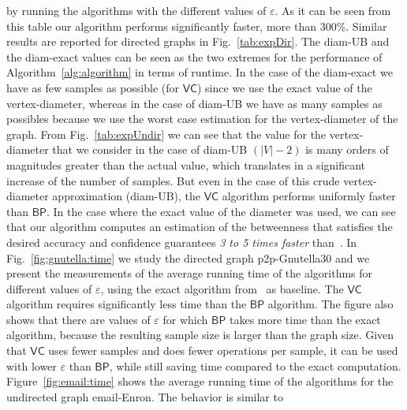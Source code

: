 by running the algorithms with the different values of $\varepsilon$. As it can
be seen from this table our algorithm performs significantly faster, more than
300\%. Similar results are reported for directed graphs in Fig.~\ref{tab:expDir}.
The diam-UB
and the diam-exact values can be seen as the two extremes for the performance of 
Algorithm~\ref{alg:algorithm} in terms of runtime. In the case of the diam-exact
we have as few samples as possible (for $\mathsf{VC}$) since we use the exact
value of the vertex-diameter, whereas in the case of diam-UB we have as many
samples as possibles because we use the worst case estimation for the
vertex-diameter of the graph.  %
From Fig.~\ref{tab:expUndir} we can see that the value for the
vertex-diameter that we consider in the case of diam-UB $(|V|-2)$ is many orders of
magnitudes greater than the actual value, which translates in a significant
increase of the number of samples. But even in the case of this crude
vertex-diameter approximation (diam-UB), the $\mathsf{VC}$ algorithm performs uniformly faster than
$\mathsf{BP}$. In the case where the exact value of the diameter was used, we
can see that our algorithm computes an estimation of the betweenness that
satisfies the desired accuracy and confidence guarantees \emph{3 to 5 times
faster} than~\citep{BrandesP07}. 
 In Fig.~\ref{fig:gnutella:time} we study
the directed graph p2p-Gnutella30 and we present the measurements of
the average running time of the algorithms for different values of
$\varepsilon$, using the exact algorithm from~\citep{Brandes01} as baseline. The
$\mathsf{VC}$ algorithm requires significantly less time than the $\mathsf{BP}$
algorithm. The figure also shows that there are values of $\varepsilon$ for
which $\mathsf{BP}$ takes more time than the exact algorithm, because the
resulting sample size is larger than the graph size. Given that $\mathsf{VC}$
uses fewer samples and does fewer operations per sample, it can be used with
lower $\varepsilon$ than $\mathsf{BP}$, while still saving time compared to the
exact computation. Figure~\ref{fig:email:time} shows the average running time of the
algorithms for the undirected graph email-Enron. The behavior is  similar to
